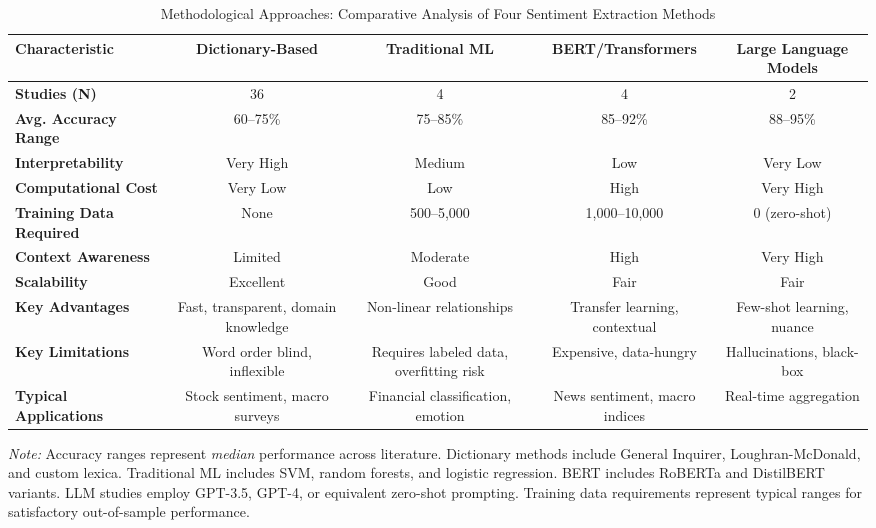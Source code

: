 

\begin{table}[h]
\centering
\caption{Methodological Approaches: Comparative Analysis of Four Sentiment Extraction Methods}
\label{tab:methods_comparison}
\small
\begin{tabular}{|l|c|c|c|c|}
\hline
\textbf{Characteristic} & \textbf{Dictionary-Based} & \textbf{Traditional ML} & \textbf{BERT/Transformers} & \textbf{Large Language Models} \\
\hline
\textbf{Studies (N)} & 36 & 4 & 4 & 2 \\
\hline
\textbf{Avg. Accuracy Range} & 60--75\% & 75--85\% & 85--92\% & 88--95\% \\
\hline
\textbf{Interpretability} & Very High & Medium & Low & Very Low \\
\hline
\textbf{Computational Cost} & Very Low & Low & High & Very High \\
\hline
\textbf{Training Data Required} & None & 500--5,000 & 1,000--10,000 & 0 (zero-shot) \\
\hline
\textbf{Context Awareness} & Limited & Moderate & High & Very High \\
\hline
\textbf{Scalability} & Excellent & Good & Fair & Fair \\
\hline
\textbf{Key Advantages} & Fast, transparent, domain knowledge & Non-linear relationships & Transfer learning, contextual & Few-shot learning, nuance \\
\hline
\textbf{Key Limitations} & Word order blind, inflexible & Requires labeled data, overfitting risk & Expensive, data-hungry & Hallucinations, black-box \\
\hline
\textbf{Typical Applications} & Stock sentiment, macro surveys & Financial classification, emotion & News sentiment, macro indices & Real-time aggregation \\
\hline
\end{tabular}
\raggedright\footnotesize
\textit{Note:} Accuracy ranges represent \emph{median} performance across literature. Dictionary methods include General Inquirer, Loughran-McDonald, and custom lexica. Traditional ML includes SVM, random forests, and logistic regression. BERT includes RoBERTa and DistilBERT variants. LLM studies employ GPT-3.5, GPT-4, or equivalent zero-shot prompting. Training data requirements represent typical ranges for satisfactory out-of-sample performance.
\end{table}

